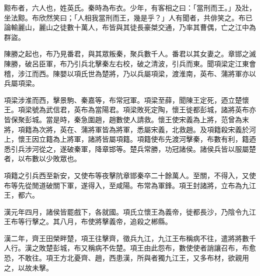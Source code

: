 
\begin{pinyinscope}
黥布者，六人也，姓英氏。秦時為布衣。少年，有客相之曰：「當刑而王。」及壯，坐法黥。布欣然笑曰；「人相我當刑而王，幾是乎？」人有聞者，共俳笑之。布已論輸麗山，麗山之徒數十萬人，布皆與其徒長豪桀交通，乃率其曹偶，亡之江中為群盜。

陳勝之起也，布乃見番君，與其眾叛秦，聚兵數千人。番君以其女妻之。章邯之滅陳勝，破呂臣軍，布乃引兵北擊秦左右校，破之清波，引兵而東。聞項梁定江東會稽，涉江而西。陳嬰以項氏世為楚將，乃以兵屬項梁，渡淮南，英布、蒲將軍亦以兵屬項梁。

項梁涉淮而西，擊景駒、秦嘉等，布常冠軍。項梁至薛，聞陳王定死，迺立楚懷王。項梁號為武信君，英布為當陽君。項梁敗死定陶，懷王徙都彭城，諸將英布亦皆保聚彭城。當是時，秦急圍趙，趙數使人請救。懷王使宋義為上將，范曾為末將，項籍為次將，英在、蒲將軍皆為將軍，悉屬宋義，北救趙。及項籍殺宋義於河上，懷王因立籍為上將軍，諸將皆屬項籍。項籍使布先渡河擊秦，布數有利，籍迺悉引兵涉河從之，遂破秦軍，降章邯等。楚兵常勝，功冠諸侯。諸侯兵皆以服屬楚者，以布數以少敗眾也。

項籍之引兵西至新安，又使布等夜擊阬章邯秦卒二十餘萬人。至關，不得入，又使布等先從閒道破關下軍，遂得入，至咸陽。布常為軍鋒。項王封諸將，立布為九江王，都六。

漢元年四月，諸侯皆罷戲下，各就國。項氏立懷王為義帝，徙都長沙，乃陰令九江王布等行擊之。其八月，布使將擊義帝，追殺之郴縣。

漢二年，齊王田榮畔楚，項王往擊齊，徵兵九江，九江王布稱病不往，遣將將數千人行。漢之敗楚彭城，布又稱病不佐楚。項王由此怨布，數使使者誚讓召布，布愈恐，不敢往。項王方北憂齊、趙，西患漢，所與者獨九江王，又多布材，欲親用之，以故未擊。


\end{pinyinscope}
